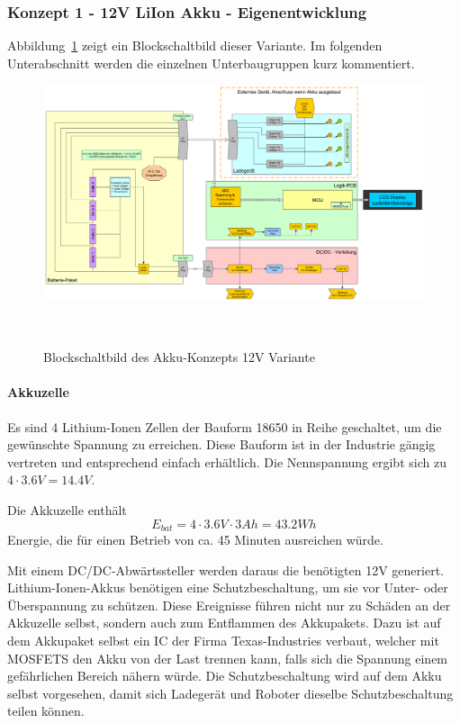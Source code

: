 \documentclass[main.tex]{subfiles} %
\begin{document}
\subsubsection{Konzept 1 - 12V LiIon Akku - Eigenentwicklung}

Abbildung~\ref{fig:Konzept_12V_Eigenentw} zeigt ein Blockschaltbild dieser
Variante. Im folgenden Unterabschnitt werden die einzelnen Unterbaugruppen kurz
kommentiert.

\begin{figure}[h!]
    \centering
    \includegraphics[width=1\textwidth]{./fig_Boardnetz/SpeisungsKonzept_LiIon_12V.pdf}
    \caption{Blockschaltbild des Akku-Konzepts 12V Variante}~\label{fig:Konzept_12V_Eigenentw}
\end{figure}

\paragraph{Akkuzelle}
Es sind 4 Lithium-Ionen Zellen der Bauform 18650 in Reihe geschaltet, um die
gewünschte Spannung zu erreichen. Diese Bauform ist in der Industrie gängig
vertreten und entsprechend einfach erhältlich. Die Nennspannung ergibt sich zu
$4 \cdot 3.6V = 14.4V$.

Die Akkuzelle enthält
\[
    E_{bat} = 4 \cdot 3.6V \cdot 3Ah = 43.2Wh
\]
Energie, die für einen Betrieb von ca. 45 Minuten ausreichen würde.

Mit einem DC/DC-Abwärtssteller werden daraus die benötigten 12V generiert.
Lithium-Ionen-Akkus benötigen eine Schutzbeschaltung, um sie vor Unter- oder
Überspannung zu schützen. Diese Ereignisse führen nicht nur zu Schäden an der
Akkuzelle selbst, sondern auch zum Entflammen des Akkupakets. Dazu ist auf dem
Akkupaket selbst ein IC der Firma Texas-Industries verbaut, welcher mit MOSFETS
den Akku von der Last trennen kann, falls sich die Spannung einem gefährlichen
Bereich nähern würde. Die Schutzbeschaltung wird auf dem Akku selbst
vorgesehen, damit sich Ladegerät und Roboter dieselbe Schutzbeschaltung teilen
können.
\end{document}

